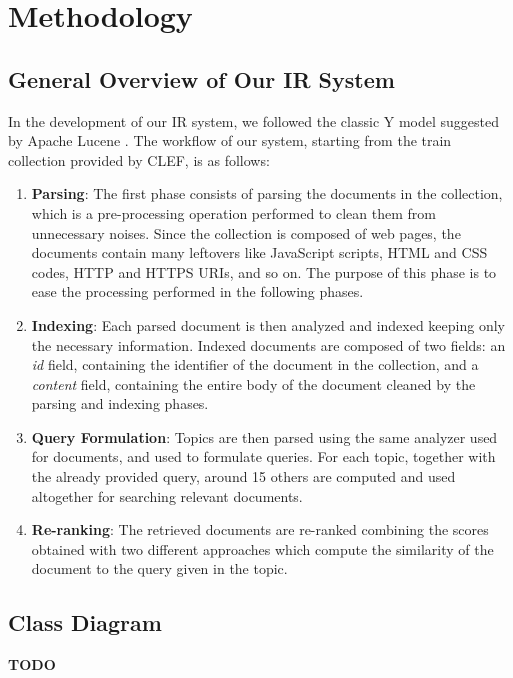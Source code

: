 \section{Methodology}
\label{sec:methodology}

\subsection{General Overview of Our IR System}
In the development of our \ac{IR} system, we followed the classic Y model suggested by Apache Lucene \cite{lucene}. The workflow of our system, starting from the train collection provided by \ac{CLEF}, is as follows:
\begin{enumerate}
    \item \textbf{Parsing}: The first phase consists of parsing the documents in the collection, which is a pre-processing operation performed to clean them from unnecessary noises. Since the collection is composed of web pages, the documents contain many leftovers like JavaScript scripts, HTML and CSS codes, HTTP and HTTPS URIs, and so on. The purpose of this phase is to ease the processing performed in the following phases.

    \item \textbf{Indexing}: Each parsed document is then analyzed and indexed keeping only the necessary information. Indexed documents are composed of two fields: an \textit{id} field, containing the identifier of the document in the collection, and a \textit{content} field, containing the entire body of the document cleaned by the parsing and indexing phases.

    \item \textbf{Query Formulation}: Topics are then parsed using the same analyzer used for documents, and used to formulate queries. For each topic, together with the already provided query, around 15 others are computed and used altogether for searching relevant documents.

    \item \textbf{Re-ranking}: The retrieved documents are re-ranked combining the scores obtained with two different approaches which compute the similarity of the document to the query given in the topic.

\end{enumerate}
\subsection{Class Diagram}
\begin{center}
    \textbf{TODO}
\end{center}

